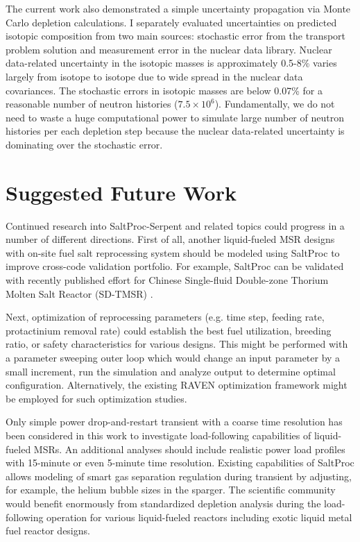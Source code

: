 The current work also demonstrated a simple uncertainty propagation via Monte 
Carlo depletion calculations. I separately evaluated uncertainties on 
predicted isotopic composition from two main sources: stochastic error from 
the transport problem solution and measurement error in the nuclear data 
library. Nuclear data-related uncertainty in the isotopic masses is 
approximately 0.5-8\% varies largely from isotope to isotope due to wide 
spread in the nuclear data covariances. The stochastic errors in isotopic 
masses are below 0.07\% for a reasonable number of neutron histories 
($7.5\times 10^6$). Fundamentally, we do not need to waste
a huge 
computational power to simulate large number of neutron histories per each 
depletion step
because the nuclear data-related uncertainty is dominating over 
the stochastic error.




\section{Suggested Future Work}
Continued research into SaltProc-Serpent and related topics could progress
in a number of different directions. First of all, another liquid-fueled 
\gls{MSR} designs with on-site fuel salt reprocessing system should be modeled 
using SaltProc to improve cross-code validation portfolio. For example, 
SaltProc can be validated with recently published effort for Chinese 
Single-fluid Double-zone Thorium Molten Salt Reactor (SD-TMSR) 
\cite{ASHRAF2019107115}.

Next, optimization of reprocessing
parameters (e.g. 
time step, feeding rate, protactinium removal
rate) could establish the best 
fuel utilization, breeding ratio, or
safety characteristics for various 
designs. This might be performed
with a parameter sweeping outer loop which 
would change an
input parameter by a small increment, run the simulation and 
analyze output to determine optimal configuration. Alternatively, the
existing 
RAVEN optimization framework \cite{alfonsi_raven_2016}
might be employed for 
such optimization studies.

Only simple power drop-and-restart transient with a coarse time resolution has 
been considered in this work to investigate load-following capabilities of 
liquid-fueled \glspl{MSR}. An additional analyses should include realistic 
power load profiles with 15-minute or even 5-minute time resolution. Existing 
capabilities of SaltProc allows modeling of smart gas separation regulation 
during transient by adjusting, for example, the helium bubble sizes in the 
sparger. The scientific community would benefit enormously from standardized 
depletion analysis during the load-following operation for various 
liquid-fueled reactors including exotic liquid metal fuel reactor designs.

